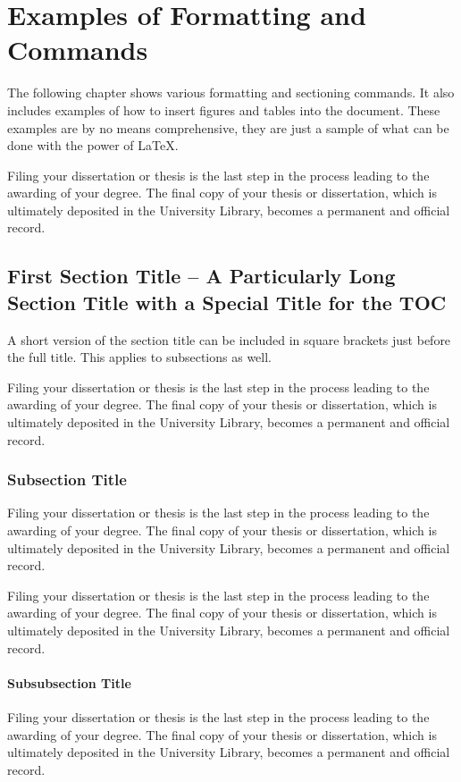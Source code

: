 \chapter{Examples of Formatting and Commands}
%
The following chapter shows various formatting and sectioning commands. It also includes examples of how to insert figures and tables into the document. These examples are by no means comprehensive, they are just a sample of what can be done with the power of \LaTeX\@.

Filing your dissertation or thesis is the last step in the process leading to the awarding of your degree. The final copy of your thesis or dissertation, which is ultimately deposited in the University Library, becomes a permanent and official record.

\section[TOC Section Title]{First Section Title -- A Particularly Long Section Title with a Special Title for the TOC}
%
A short version of the section title can be included in square brackets just before the full title. This applies to subsections as well.

Filing your dissertation or thesis is the last step in the process leading to the awarding of your degree. The final copy of your thesis or dissertation, which is ultimately deposited in the University Library, becomes a permanent and official record.

\subsection[A Very Long Subsection Title to Test the TOC Wrapping Ability]{Subsection Title}
%
Filing your dissertation or thesis is the last step in the process leading to the awarding of your degree. The final copy of your thesis or dissertation, which is ultimately deposited in the University Library, becomes a permanent and official record.

Filing your dissertation or thesis is the last step in the process leading to the awarding of your degree. The final copy of your thesis or dissertation, which is ultimately deposited in the University Library, becomes a permanent and official record.

\subsubsection{Subsubsection Title}
%
Filing your dissertation or thesis is the last step in the process leading to the awarding of your degree. The final copy of your thesis or dissertation, which is ultimately deposited in the University Library, becomes a permanent and official record.

